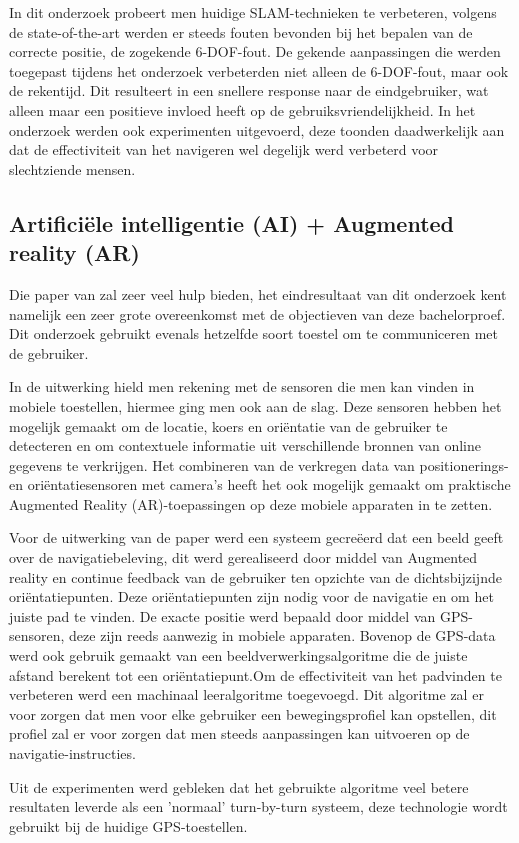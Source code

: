 In dit onderzoek probeert men huidige SLAM-technieken te verbeteren, volgens de state-of-the-art werden er steeds fouten bevonden bij het bepalen van de correcte positie, de zogekende 6-DOF-fout. De gekende aanpassingen die werden toegepast tijdens het onderzoek verbeterden niet alleen de 6-DOF-fout, maar ook de rekentijd. Dit resulteert in een snellere response naar de eindgebruiker, wat alleen maar een positieve invloed heeft op de gebruiksvriendelijkheid. In het onderzoek werden ook experimenten uitgevoerd, deze toonden daadwerkelijk aan dat de effectiviteit van het navigeren wel degelijk werd verbeterd voor slechtziende mensen.

\subsection{Artificiële intelligentie (AI) + Augmented reality (AR)}
Die paper van \autocite{Pouria2016} zal zeer veel hulp bieden, het eindresultaat van dit onderzoek kent namelijk een zeer grote overeenkomst met de objectieven van deze bachelorproef. Dit onderzoek gebruikt evenals hetzelfde soort toestel om te communiceren met de gebruiker.

In de uitwerking hield men rekening met de sensoren die men kan vinden in mobiele toestellen, hiermee ging men ook aan de slag. Deze sensoren hebben het mogelijk gemaakt om de locatie, koers en oriëntatie van de gebruiker te detecteren en om contextuele informatie uit verschillende bronnen van online gegevens te verkrijgen. Het combineren van de verkregen data van positionerings- en oriëntatiesensoren met camera's heeft het ook mogelijk gemaakt om praktische Augmented Reality (AR)-toepassingen op deze mobiele apparaten in te zetten. 

Voor de uitwerking van de paper werd een systeem gecreëerd dat een beeld geeft over de navigatiebeleving, dit werd gerealiseerd door middel van Augmented reality en continue feedback van de gebruiker ten opzichte van de dichtsbijzijnde oriëntatiepunten. Deze oriëntatiepunten zijn nodig voor de navigatie en om het juiste pad te vinden. De exacte positie werd bepaald door middel van GPS-sensoren, deze zijn reeds aanwezig in mobiele apparaten. Bovenop de GPS-data werd ook gebruik gemaakt van een beeldverwerkingsalgoritme die de juiste afstand berekent tot een oriëntatiepunt.Om de effectiviteit van het padvinden te verbeteren werd een machinaal leeralgoritme toegevoegd. Dit algoritme zal er voor zorgen dat men voor elke gebruiker een bewegingsprofiel kan opstellen, dit profiel zal er voor zorgen dat men steeds aanpassingen kan uitvoeren op de navigatie-instructies.

Uit de experimenten werd gebleken dat het gebruikte algoritme veel betere resultaten leverde als een 'normaal' turn-by-turn systeem, deze technologie wordt gebruikt bij de huidige GPS-toestellen.

